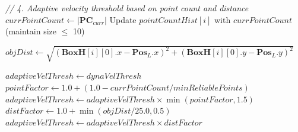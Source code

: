 \documentclass[14pt,a4paper]{article}
\begin{document}
\begin{algorithm}
\begin{algorithmic}[1]
    \State \textit{// 4. Adaptive velocity threshold based on point count and distance}
    \State $currPointCount \gets |\mathbf{PC}_{curr}|$
    \State Update $pointCountHist[i]$ with $currPointCount$ (maintain size $\leq$ 10)
    
    \State $objDist \gets \sqrt{(\mathbf{BoxH}[i][0].x - \mathbf{Pos}_L.x)^2 + (\mathbf{BoxH}[i][0].y - \mathbf{Pos}_L.y)^2}$
    
    \State $adaptiveVelThresh \gets dynaVelThresh$
        \State $pointFactor \gets 1.0 + (1.0 - currPointCount / minReliablePoints)$
        \State $adaptiveVelThresh \gets adaptiveVelThresh \times \min(pointFactor, 1.5)$
    \EndIf
    \State $distFactor \gets 1.0 + \min(objDist / 25.0, 0.5)$
    \State $adaptiveVelThresh \gets adaptiveVelThresh \times distFactor$
    
\end{algorithmic}
\end{algorithm}
\end{document}
